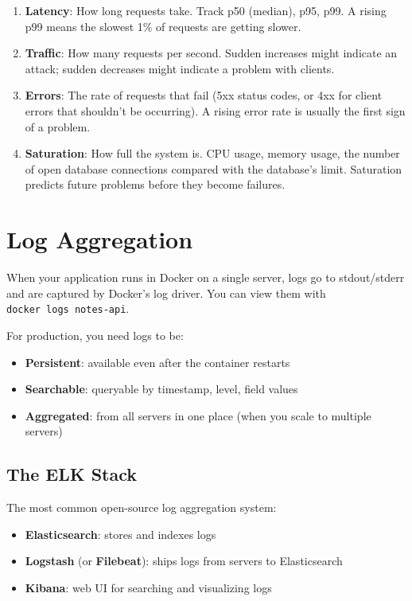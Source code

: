 \begin{enumerate}
\def\labelenumi{\arabic{enumi}.}
\item
  \textbf{Latency}: How long requests take. Track p50 (median), p95, p99. A rising p99 means the slowest 1\% of requests are getting slower.
\item
  \textbf{Traffic}: How many requests per second. Sudden increases might indicate an attack; sudden decreases might indicate a problem with clients.
\item
  \textbf{Errors}: The rate of requests that fail (5xx status codes, or 4xx for client errors that shouldn't be occurring). A rising error rate is usually the first sign of a problem.
\item
  \textbf{Saturation}: How full the system is. CPU usage, memory usage, the number of open database connections compared with the database's limit. Saturation predicts future problems before they become failures.
\end{enumerate}

\setcounter{section}{4}
\section{Log Aggregation}\label{35-observability:355-log-aggregation}

When your application runs in Docker on a single server, logs go to stdout/stderr and are captured by Docker's log driver. You can view them with \texttt{docker\ logs\ notes-api}.

For production, you need logs to be:

\begin{itemize}
\tightlist
\item
  \textbf{Persistent}: available even after the container restarts
\item
  \textbf{Searchable}: queryable by timestamp, level, field values
\item
  \textbf{Aggregated}: from all servers in one place (when you scale to multiple servers)
\end{itemize}

\subsection*{The ELK Stack}\label{35-observability:the-elk-stack}

The most common open-source log aggregation system:

\begin{itemize}
\tightlist
\item
  \textbf{Elasticsearch}: stores and indexes logs
\item
  \textbf{Logstash} (or \textbf{Filebeat}): ships logs from servers to Elasticsearch
\item
  \textbf{Kibana}: web UI for searching and visualizing logs
\end{itemize}

